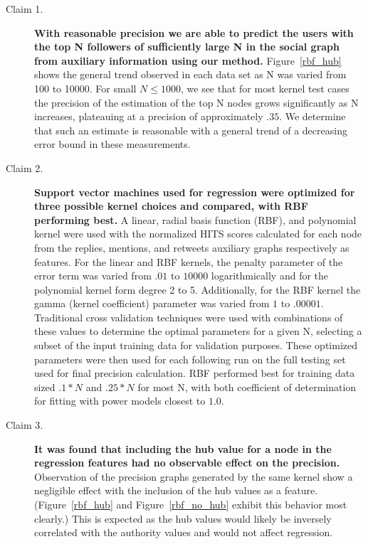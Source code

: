 \documentclass{sig-alternate-10pt}
\begin{document}
\begin{description}
    \item [Claim 1.]
    \textbf{With reasonable precision we are able to predict the users with the top N followers of sufficiently large N in the social graph from auxiliary information using our method.}
    Figure~\ref{rbf_hub} shows the general trend observed in each data set as N was varied from 100 to 10000.
    For small $N \leq 1000$, we see that for most kernel test cases the precision of the estimation of the top N nodes grows significantly as N increases, plateauing at a precision of approximately $.35$.
    We determine that such an estimate is reasonable with a general trend of a decreasing error bound in these measurements.
    

    \item [Claim 2.]
    \textbf{Support vector machines used for regression were optimized for three possible kernel choices and compared, with RBF performing best.}
     A linear, radial basis function (RBF), and polynomial kernel were used with the normalized HITS scores calculated for each node from the replies, mentions, and retweets auxiliary graphs respectively as features.
     For the linear and RBF kernels, the penalty parameter of the error term was varied from $.01$ to $10000$ logarithmically and for the polynomial kernel form degree 2 to 5.
     Additionally, for the RBF kernel the gamma (kernel coefficient) parameter was varied from $1$ to $.00001$.
     Traditional cross validation techniques were used with combinations of these values to determine the optimal parameters for a given N, selecting a subset of the input training data for validation purposes.
     These optimized parameters were then used for each following run on the full testing set used for final precision calculation.
     RBF performed best for training data sized $.1*N$ and $.25*N$ for most N, with both coefficient of determination for fitting with power models closest to $1.0$.
    

    \item [Claim 3.]
    \textbf{It was found that including the hub value for a node in the regression features had no observable effect on the precision.}
    Observation of the precision graphs generated by the same kernel show a negligible effect with the inclusion of the hub values as a feature.
    (Figure~\ref{rbf_hub} and Figure~\ref{rbf_no_hub} exhibit this behavior most clearly.)
    This is expected as the hub values would likely be inversely correlated with the authority values and would not affect regression.
    

\end{description}
\end{document}
